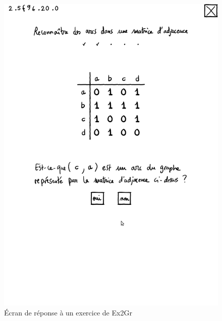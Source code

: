 \documentclass[a4paper]{article}
\begin{document}
\begin{figure}[htbp]
  \centering
\includegraphics[width=12cm]{exo.png}
\caption{Écran de réponse à un exercice de Ex2Gr}\label{fig:exo}
\end{figure}
\end{document}
